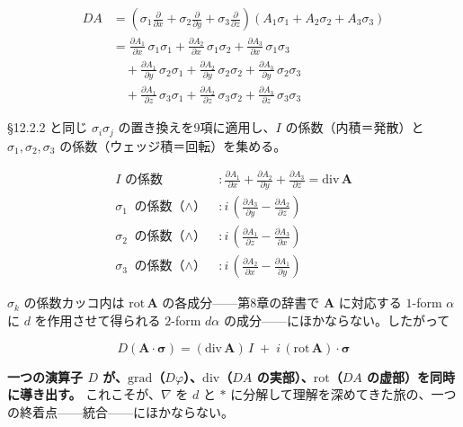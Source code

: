 \documentclass[a4paper,12pt,openany]{book}
\begin{document}
\[
\begin{aligned}
D A &= (\sigma_1\tfrac{\partial}{\partial x} + \sigma_2\tfrac{\partial}{\partial y} + \sigma_3\tfrac{\partial}{\partial z})(A_1\sigma_1 + A_2\sigma_2 + A_3\sigma_3) \\[4pt]
&= \tfrac{\partial A_1}{\partial x}\,\sigma_1\sigma_1 + \tfrac{\partial A_2}{\partial x}\,\sigma_1\sigma_2 + \tfrac{\partial A_3}{\partial x}\,\sigma_1\sigma_3 \\
&\quad + \tfrac{\partial A_1}{\partial y}\,\sigma_2\sigma_1 + \tfrac{\partial A_2}{\partial y}\,\sigma_2\sigma_2 + \tfrac{\partial A_3}{\partial y}\,\sigma_2\sigma_3 \\
&\quad + \tfrac{\partial A_1}{\partial z}\,\sigma_3\sigma_1 + \tfrac{\partial A_2}{\partial z}\,\sigma_3\sigma_2 + \tfrac{\partial A_3}{\partial z}\,\sigma_3\sigma_3
\end{aligned}
\]

§12.2.2 と同じ \(\sigma_i\sigma_j\) の置き換えを9項に適用し、\(I\)
の係数（内積＝発散）と \(\sigma_1,\sigma_2,\sigma_3\)
の係数（ウェッジ積＝回転）を集める。

\[
\begin{aligned}
I\text{ の係数} &: \frac{\partial A_1}{\partial x} + \frac{\partial A_2}{\partial y} + \frac{\partial A_3}{\partial z} = \mathrm{div}\,\mathbf{A} \\
\sigma_1\text{ の係数（$\wedge$）} &: i\,\left(\frac{\partial A_3}{\partial y} - \frac{\partial A_2}{\partial z}\right) \\
\sigma_2\text{ の係数（$\wedge$）} &: i\,\left(\frac{\partial A_1}{\partial z} - \frac{\partial A_3}{\partial x}\right) \\
\sigma_3\text{ の係数（$\wedge$）} &: i\,\left(\frac{\partial A_2}{\partial x} - \frac{\partial A_1}{\partial y}\right)
\end{aligned}
\]

\(\sigma_k\) の係数カッコ内は \(\mathrm{rot}\,\mathbf{A}\)
の各成分——第8章の辞書で \(\mathbf{A}\) に対応する \(1\)-form
\(\alpha\) に \(d\) を作用させて得られる \(2\)-form \(d\alpha\)
の成分——にほかならない。したがって

\[D(\mathbf{A}\!\cdot\!\bm{\sigma}) = (\mathrm{div}\,\mathbf{A})\,I \;+\; i\,(\mathrm{rot}\,\mathbf{A})\!\cdot\!\bm{\sigma}\]

\textbf{一つの演算子 $D$ が、$\mathrm{grad}$（$D\varphi$）、$\mathrm{div}$（$DA$ の実部）、$\mathrm{rot}$（$DA$ の虚部）を同時に導き出す。}
これこそが、\(\nabla\) を \(d\) と \(\ast\)
に分解して理解を深めてきた旅の、一つの終着点——統合——にほかならない。
\end{document}
